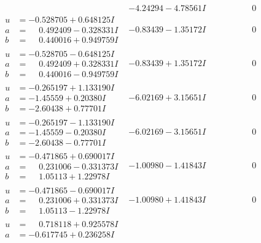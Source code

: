 \documentclass[1p]{elsarticle_modified}
\theoremstyle{definition}
\begin{document}
$$\begin{array}{c|c|c}
 & -4.24294 - 4.78561 I & \phantom{-0.000000 } 0 \\ \hline\begin{aligned}
u &= -0.528705 + 0.648125 I \\
a &= \phantom{-}0.492409 - 0.328331 I \\
b &= \phantom{-}0.440016 + 0.949759 I\end{aligned}
 & -0.83439 - 1.35172 I & \phantom{-0.000000 } 0 \\ \hline\begin{aligned}
u &= -0.528705 - 0.648125 I \\
a &= \phantom{-}0.492409 + 0.328331 I \\
b &= \phantom{-}0.440016 - 0.949759 I\end{aligned}
 & -0.83439 + 1.35172 I & \phantom{-0.000000 } 0 \\ \hline\begin{aligned}
u &= -0.265197 + 1.133190 I \\
a &= -1.45559 + 0.20380 I \\
b &= -2.60438 + 0.77701 I\end{aligned}
 & -6.02169 + 3.15651 I & \phantom{-0.000000 } 0 \\ \hline\begin{aligned}
u &= -0.265197 - 1.133190 I \\
a &= -1.45559 - 0.20380 I \\
b &= -2.60438 - 0.77701 I\end{aligned}
 & -6.02169 - 3.15651 I & \phantom{-0.000000 } 0 \\ \hline\begin{aligned}
u &= -0.471865 + 0.690017 I \\
a &= \phantom{-}0.231006 - 0.331373 I \\
b &= \phantom{-}1.05113 + 1.22978 I\end{aligned}
 & -1.00980 - 1.41843 I & \phantom{-0.000000 } 0 \\ \hline\begin{aligned}
u &= -0.471865 - 0.690017 I \\
a &= \phantom{-}0.231006 + 0.331373 I \\
b &= \phantom{-}1.05113 - 1.22978 I\end{aligned}
 & -1.00980 + 1.41843 I & \phantom{-0.000000 } 0 \\ \hline\begin{aligned}
u &= \phantom{-}0.718118 + 0.925578 I \\
a &= -0.617745 + 0.236258 I \\

\end{aligned}
\end{array}$$
\end{document}
